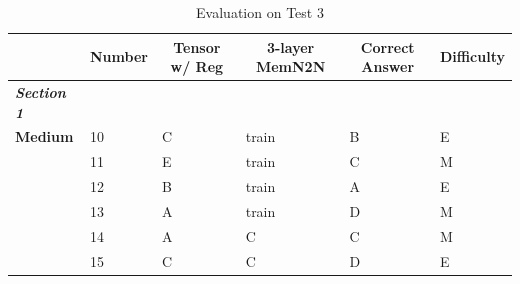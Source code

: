 \documentclass[pageno]{final_paper}
\newcommand{\textbi}[1]{\textbf{\textit{#1}}}
\begin{document}
\begin{table}[]
\footnotesize
\centering
\caption{Evaluation on Test 3}
\label{tab: Evaluation on Test 3}
\begin{tabular}{@{}llllll@{}}
\toprule
\multicolumn{1}{c}{}    & \multicolumn{1}{c}{\textbf{Number}} & \multicolumn{1}{c}{\textbf{Tensor w/ Reg}} & \multicolumn{1}{c}{\textbf{3-layer MemN2N}} & \multicolumn{1}{c}{\textbf{Correct Answer}} & \multicolumn{1}{c}{\textbf{Difficulty}} \\ \midrule
\textbi{Section 1}      &                                     &                                            &                                             &                                             &                                         \\ \midrule
\textbf{Medium}         & 10                                  & C                                          & train                                       & B                                           & E                                       \\
\textbf{}               & 11                                  & E                                          & train                                       & C                                           & M                                       \\
\textbf{}               & 12                                  & B                                          & train                                       & A                                           & E                                       \\
\textbf{}               & 13                                  & A                                          & train                                       & D                                           & M                                       \\
\textbf{}               & 14                                  & A                                          & C                                           & C                                           & M                                       \\
\textbf{}               & 15                                  & C                                          & C                                           & D                                           & E                                       \\

\end{tabular}
\end{table}
\end{document}

